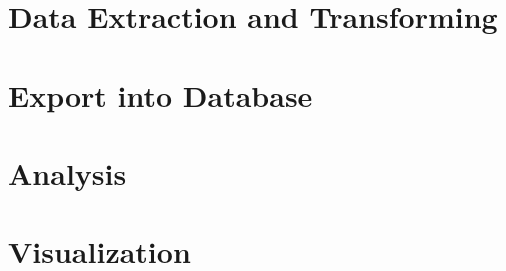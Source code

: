 \section{Data Extraction and Transforming}
\label{sec:data_extraction_transforming}

\section{Export into Database}
\label{sec:export_db}

\section{Analysis}
\label{sec:analysis}

\section{Visualization}
\label{sec:visualization}
